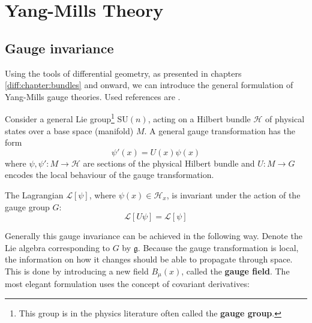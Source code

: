 \chapter{Yang-Mills Theory}

\section{Gauge invariance}

	Using the tools of differential geometry, as presented in chapters \ref{diff:chapter:bundles} and onward, we can introduce the general formulation of Yang-Mills gauge theories. Used references are \cite{principal_bundles,sen_nash,schuller, gauge1}.

	Consider a general Lie group\footnote{This group is in the physics literature often called the \textbf{gauge group}.} SU$(n)$, acting on a Hilbert bundle $\mathcal{H}$ of physical states over a base space (manifold) $M$. A general gauge transformation has the form
	\begin{equation}
		\label{qft:gauge_transformation}
		\psi'(x) = U(x)\psi(x)
	\end{equation}
	where $\psi, \psi':M\rightarrow\mathcal{H}$ are sections of the physical Hilbert bundle and $U:M\rightarrow G$ encodes the local behaviour of the gauge transformation.
	
	\begin{theorem}
		The Lagrangian $\mathcal{L}[\psi]$, where $\psi(x)\in\mathcal{H}_x$, is invariant under the action of the gauge group $G$:
		\begin{equation}
			\mathcal{L}[U\psi] = \mathcal{L}[\psi]
		\end{equation}
	\end{theorem}

	Generally this gauge invariance can be achieved in the following way. Denote the Lie algebra corresponding to $G$ by $\mathfrak{g}$. Because the gauge transformation is local, the information on how it changes should be able to propagate through space. This is done by introducing a new field $B_\mu(x)$, called the \textbf{gauge field}. The most elegant formulation uses the concept of covariant derivatives:
	
